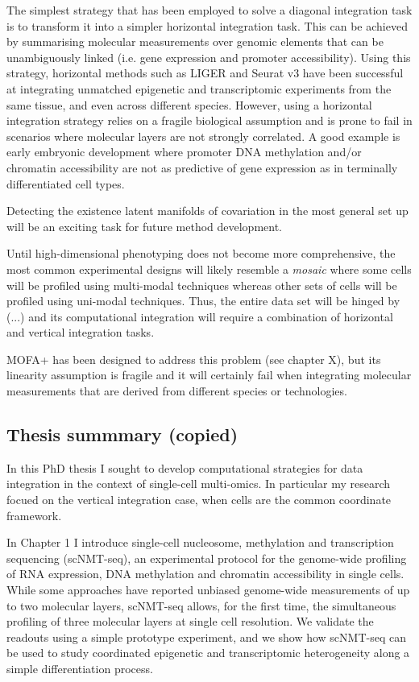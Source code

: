 The simplest strategy that has been employed to solve a diagonal integration task is to transform it into a simpler horizontal integration task. This can be achieved by summarising molecular measurements over genomic elements that can be unambiguously linked (i.e. gene expression and promoter accessibility). Using this strategy, horizontal methods such as LIGER and Seurat v3 have been successful at integrating unmatched epigenetic and transcriptomic experiments from the same tissue, and even across different species. However, using a horizontal integration strategy relies on a fragile biological assumption and is prone to fail in scenarios where molecular layers are not strongly correlated. A good example is early embryonic development where promoter DNA methylation and/or chromatin accessibility are not as predictive of gene expression as in terminally differentiated cell types. 

Detecting the existence latent manifolds of covariation in the most general set up will be an exciting task for future method development. 

Until high-dimensional phenotyping does not become more comprehensive, the most common experimental designs will likely resemble a \textit{mosaic} where some cells will be profiled using multi-modal techniques whereas other sets of cells will be profiled using uni-modal techniques. Thus, the entire data set will be hinged by (...) and its computational integration will require a combination of horizontal and vertical integration tasks. 

MOFA+ has been designed to address this problem (see chapter X), but its linearity assumption is fragile and it will certainly fail when integrating molecular measurements that are derived from different species or technologies.


\subsection{Thesis summmary (copied)}

In this PhD thesis I sought to develop computational strategies for data integration in the context of single-cell multi-omics. In particular my research focued on the vertical integration case, when cells are the common coordinate framework.

In Chapter 1 I introduce single-cell nucleosome, methylation and transcription sequencing (scNMT-seq), an experimental protocol for the genome-wide profiling of RNA expression, DNA methylation and chromatin accessibility in single cells. While some approaches have reported unbiased genome-wide measurements of up to two molecular layers, scNMT-seq allows, for the first time, the simultaneous profiling of three molecular layers at single cell resolution. We validate the readouts using a simple prototype experiment, and we show how scNMT-seq can be used to study coordinated epigenetic and transcriptomic heterogeneity along a simple differentiation process.

